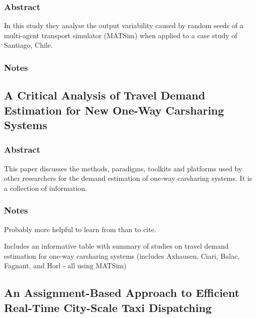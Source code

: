\documentclass[
]{article}
\begin{document}
\hypertarget{abstract-5}{%
\subsubsection{Abstract}\label{abstract-5}}

In this study they analyse the output variability caused by random seeds
of a multi-agent transport simulator (MATSim) when applied to a case
study of Santiago, Chile.

\hypertarget{notes-5}{%
\subsubsection{Notes}\label{notes-5}}

\hypertarget{a-critical-analysis-of-travel-demand-estimation-for-new-one-way-carsharing-systems}{%
\subsection{A Critical Analysis of Travel Demand Estimation for New
One-Way Carsharing
Systems}\label{a-critical-analysis-of-travel-demand-estimation-for-new-one-way-carsharing-systems}}

\hypertarget{abstract-6}{%
\subsubsection{Abstract}\label{abstract-6}}

This paper discusses the methods, paradigms, toolkits and platforms used
by other researchers for the demand estimation of one-way carsharing
systems. It is a collection of information.

\hypertarget{notes-6}{%
\subsubsection{Notes}\label{notes-6}}

Probably more helpful to learn from than to cite.

Includes an informative table with summary of studies on travel demand
estimation for one-way carsharing systems (includes Axhausen, Ciari,
Balac, Fagnant, and Horl - all using MATSim)

\hypertarget{an-assignment-based-approach-to-efficient-real-time-city-scale-taxi-dispatching}{%
\subsection{An Assignment-Based Approach to Efficient Real-Time
City-Scale Taxi
Dispatching}\label{an-assignment-based-approach-to-efficient-real-time-city-scale-taxi-dispatching}}
\end{document}
